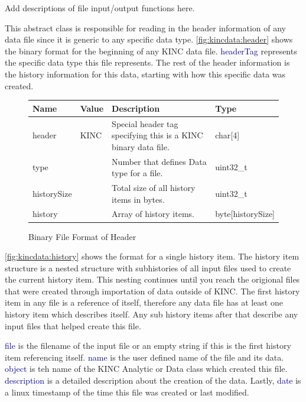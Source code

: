 \documentclass[10pt]{article}
\providecommand{\h}[1]{\textcolor{darkblue}{#1}}
\begin{document}
Add descriptions of file input/output functions here.

This abstract class is responsible for reading in the header information of any 
data file since it is generic to any specific data type. 
\autoref{fig:kincdata:header} shows the binary format for the beginning of any 
KINC data file. \h{headerTag} represents the specific data type this file 
represents. The rest of the header information is the history information for 
this data, starting with how this specific data was created.

\begin{figure}[H]
\begin{mdframed}[style=btable]
\begin{tabularx}{\textwidth}{|l|l|X|l|}
\hline
\textbf{Name} & \textbf{Value} & \textbf{Description} & \textbf{Type} \\
\hline
header & KINC & Special header tag specifying this is a KINC binary data file. 
& char[4] \\
\hline
type & & Number that defines Data type for a file. & uint32\_t \\
\hline
historySize & & Total size of all history items in bytes. & uint32\_t \\
\hline
history & & Array of history items. & byte[historySize] \\
\hline
\end{tabularx}
\end{mdframed}
\caption{Binary File Format of Header}
\label{fig:kincdata:header}
\end{figure}

\autoref{fig:kincdata:history} shows the format for a single history item. The 
history item structure is a nested structure with subhistories of all input 
files used to create the current history item. This nesting continues until you 
reach the origional files that were created through importation of data outside 
of KINC. The first history item in any file is a reference of itself, therefore 
any data file has at least one history item which describes itself. Any sub 
history items after that describe any input files that helped create this file.

\h{file} is the filename of the input file or an empty string if this is the 
first history item referencing itself. \h{name} is the user defined name of the 
file and its data. \h{object} is teh name of the KINC Analytic or Data class 
which created this file. \h{description} is a detailed description about the 
creation of the data. Lastly, \h{date} is a linux timestamp of the time this 
file was created or last modified.
\end{document}
